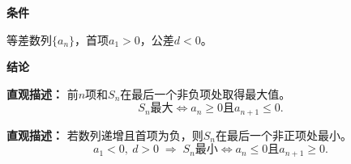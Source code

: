 \begin{statementbox}

	\textbf{\textcolor{CStatement}{条件}}
	\begin{description}[style=nextline, leftmargin=2.8em, labelsep=0.5em, itemsep=0.35em]
		\item[\textbf{\textcolor{CStatement}{条件1（数列类型）：}}] 等差数列$\{a_n\}$，首项$a_1>0$，公差$d<0$。
	\end{description}

	\textbf{\textcolor{CStatement}{结论}}
	\begin{description}[style=nextline, leftmargin=2.8em, labelsep=0.5em, itemsep=0.45em]
		\item[\textbf{\textcolor{CStatement}{结论一（最值位置）：}}]
			\textbf{\textcolor{CStatement}{直观描述：}}
			前$n$项和$S_n$在最后一个非负项处取得最大值。
			\[
				S_n\text{最大} \iff a_n\ge 0 \text{且} a_{n+1}\le 0.
			\]

		\item[\textbf{\textcolor{CStatement}{推广结论（对偶情形）：}}]
			\textbf{\textcolor{CStatement}{直观描述：}}
			若数列递增且首项为负，则$S_n$在最后一个非正项处最小。
			\[
				a_1<0,\ d>0 \;\Longrightarrow\; S_n\text{最小} \iff a_n\le 0 \text{且} a_{n+1}\ge 0.
			\]
	\end{description}

\end{statementbox}
